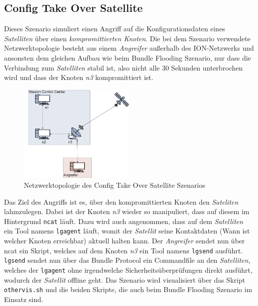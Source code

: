\documentclass{article}
\begin{document}
\subsection{Config Take Over Satellite}
Dieses Szenario simuliert einen Angriff auf die Konfigurationsdaten eines \textit{Satelliten} über einen \textit{kompromittierten Knoten}. Die bei dem Szenario verwendete Netzwerktopologie besteht aus einem \textit{Angreifer} außerhalb des ION-Netzwerks und ansonsten dem gleichen Aufbau wie beim Bundle Flooding Szenario, nur dass die Verbindung zum \textit{Satelliten} stabil ist, also nicht alle 30 Sekunden unterbrochen wird und dass der Knoten \textit{n3} kompromittiert ist.
\par
\begin{figure}[h]
\centering
\includegraphics[width=0.5\textwidth]{ctos}
\caption{Netzwerktopologie des Config Take Over Satellite Szenarios}
\end{figure}
Das Ziel des Angriffs ist es, über den kompromittierten Knoten den \textit{Sateliten} lahmzulegen.
Dabei ist der Knoten \textit{n3} wieder so manipuliert, dass auf diesem im Hintergrund \texttt{ncat} läuft. Dazu wird auch angenommen, dass auf dem \textit{Satelliten} ein Tool namens \texttt{lgagent} läuft, womit der \textit{Satellit} seine Kontaktdaten (Wann ist welcher Knoten erreichbar) aktuell halten kann.
Der \textit{Angreifer} sendet nun über ncat ein Skript, welches auf dem Knoten \textit{n3} ein Tool namens \texttt{lgsend} ausführt. \texttt{lgsend} sendet nun über das Bundle Protocol ein Commandfile an den \textit{Satelliten}, welches der \texttt{lgagent} ohne irgendwelche Sicherheitsüberprüfungen direkt ausführt, wodurch der \textit{Satellit} offline geht.
Das Szenario wird visualisiert über das Skript \texttt{othervis.sh} und die beiden Skripte, die auch beim Bundle Flooding Szenario im Einsatz sind.
\end{document}
